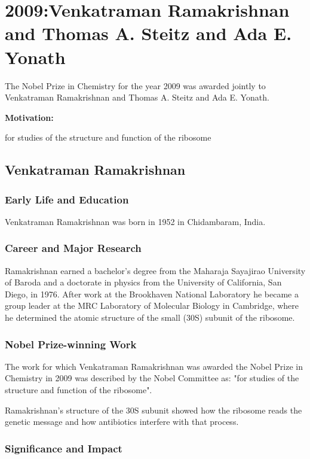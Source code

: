 \chapter{2009:Venkatraman Ramakrishnan and Thomas A. Steitz and Ada E. Yonath}

\label{chap:chemistry2009}

The Nobel Prize in Chemistry for the year 2009 was awarded jointly to Venkatraman Ramakrishnan and Thomas A. Steitz and Ada E. Yonath.

\textbf{Motivation:}

for studies of the structure and function of the ribosome

\section{Venkatraman Ramakrishnan}

\subsection*{Early Life and Education}

Venkatraman Ramakrishnan was born in 1952 in Chidambaram, India.

\subsection*{Career and Major Research}

Ramakrishnan earned a bachelor's degree from the Maharaja Sayajirao University of Baroda and a doctorate in physics from the University of California, San Diego, in 1976. After work at the Brookhaven National Laboratory he became a group leader at the MRC Laboratory of Molecular Biology in Cambridge, where he determined the atomic structure of the small (30S) subunit of the ribosome.

\subsection*{Nobel Prize-winning Work}

The work for which Venkatraman Ramakrishnan was awarded the Nobel Prize in Chemistry in 2009 was described by the Nobel Committee as: "for studies of the structure and function of the ribosome".

Ramakrishnan's structure of the 30S subunit showed how the ribosome reads the genetic message and how antibiotics interfere with that process.

\subsection*{Significance and Impact}

